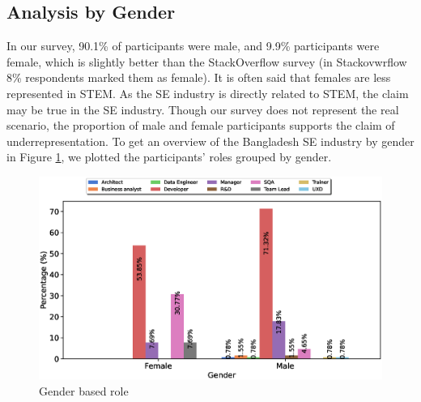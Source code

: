 \subsection{Analysis by Gender}
\label{analysis by gender}

In our survey, 90.1\% of participants were male, and 9.9\% participants were female, which is slightly better than the StackOverflow survey\cite{StackoverflowSurvey2017,StackoverflowSurvey2018,StackoverflowSurvey2019,StackoverflowSurvey2020} (in Stackovwrflow 8\% respondents marked them as female). It is often said that females are less represented in STEM. As the SE industry is directly related to STEM, the claim may be true in the SE industry. Though our survey does not represent the real scenario, the proportion of male and female participants supports the claim of underrepresentation. To get an overview of the Bangladesh SE industry by gender in Figure \ref{fig:gender and role}, we plotted the participants' roles grouped by gender. 
\begin{figure}[h]
\centering
  \includegraphics[scale=0.4]{Figures/Gender_and_Role}
  \caption{Gender based role}
  \label{fig:gender and role}
\end{figure}
